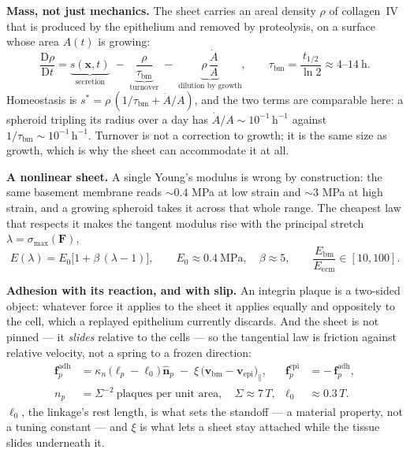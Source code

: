 \documentclass[10pt,a4paper]{article}
\begin{document}
\textbf{Mass, not just mechanics.} The sheet carries an areal density $\rho$ of collagen~IV that is
produced by the epithelium and removed by proteolysis, on a surface whose area $A(t)$ is growing:
%
\begin{equation}
\frac{\mathrm{D}\rho}{\mathrm{D}t}
= \underbrace{s(\mathbf x,t)}_{\text{secretion}}
\;-\;\underbrace{\frac{\rho}{\tau_{\text{bm}}}}_{\text{turnover}}
\;-\;\underbrace{\rho\,\frac{\dot A}{A}}_{\text{dilution by growth}},
\qquad
\tau_{\text{bm}}=\frac{t_{1/2}}{\ln 2}\approx 4\text{--}14\ \text{h}.
\label{eq:bmmass}
\end{equation}
%
Homeostasis is $s^\ast=\rho\,(1/\tau_{\text{bm}}+\dot A/A)$, and the two terms are comparable here:
a spheroid tripling its radius over a day has $\dot A/A\sim\!10^{-1}\,\text{h}^{-1}$ against
$1/\tau_{\text{bm}}\sim\!10^{-1}\,\text{h}^{-1}$. Turnover is not a correction to growth; it is the same
size as growth, which is why the sheet can accommodate it at all.

\textbf{A nonlinear sheet.} A single Young's modulus is wrong by construction: the same basement
membrane reads $\sim\!0.4$ MPa at low strain and $\sim\!3$ MPa at high strain, and a growing spheroid
takes it across that whole range. The cheapest law that respects it makes the tangent modulus rise with
the principal stretch $\lambda=\sigma_{\max}(\mathbf F)$,
%
\begin{equation}
E(\lambda)=E_0\bigl[1+\beta\,(\lambda-1)\bigr],
\qquad E_0\approx 0.4\ \text{MPa},\quad \beta\approx 5,
\qquad \frac{E_{\text{bm}}}{E_{\text{ecm}}}\in[10,100].
\label{eq:bmstiff}
\end{equation}

\textbf{Adhesion with its reaction, and with slip.} An integrin plaque is a two-sided object: whatever
force it applies to the sheet it applies equally and oppositely to the cell, which a replayed
epithelium currently discards. And the sheet is not pinned --- it \emph{slides} relative to the cells
--- so the tangential law is friction against relative velocity, not a spring to a frozen direction:
%
\begin{align}
\mathbf f^{\text{adh}}_p &= \kappa_n\,\bigl(\ell_p-\ell_0\bigr)\,\hat{\mathbf n}_p
\;-\;\xi\,\bigl(\mathbf v_{\text{bm}}-\mathbf v_{\text{epi}}\bigr)_{\parallel},
&\mathbf f^{\text{epi}}_p&=-\,\mathbf f^{\text{adh}}_p,
\label{eq:adh}\\[2pt]
n_p &= \Sigma^{-2}\ \text{plaques per unit area}, \quad \Sigma\approx 7\,T,
&\ell_0&\approx 0.3\,T .
\label{eq:plaque}
\end{align}
%
$\ell_0$, the linkage's rest length, is what sets the standoff --- a material property, not a tuning
constant --- and $\xi$ is what lets a sheet stay attached while the tissue slides underneath it.
\end{document}
